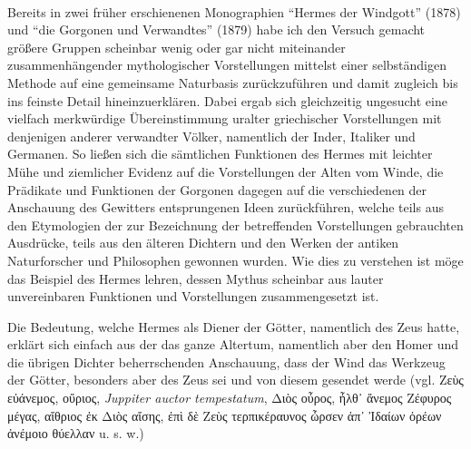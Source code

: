 \documentclass[a4paper, 11pt, oneside]{article}
\begin{document}
\paragraph{}
Bereits in zwei früher erschienenen Monographien "`Hermes der Windgott"' (1878) und "`die Gorgonen und Verwandtes"' (1879) habe ich den Versuch gemacht größere Gruppen scheinbar wenig oder gar nicht miteinander zusammenhängender mythologischer Vorstellungen mittelst einer selbständigen Methode auf eine gemeinsame Naturbasis zurückzuführen und damit zugleich bis ins feinste Detail hineinzuerklären. Dabei ergab sich gleichzeitig ungesucht eine vielfach merkwürdige Übereinstimmung uralter griechischer Vorstellungen mit denjenigen anderer verwandter Völker, namentlich der Inder, Italiker und Germanen. So ließen sich die sämtlichen Funktionen des Hermes mit leichter Mühe und ziemlicher Evidenz auf die Vorstellungen der Alten vom Winde, die Prädikate und Funktionen der Gorgonen dagegen auf die verschiedenen der Anschauung des Gewitters entsprungenen Ideen zurückführen, welche teils aus den Etymologien der zur Bezeichnung der betreffenden Vorstellungen gebrauchten Ausdrücke, teils aus den älteren Dichtern und den Werken der antiken Naturforscher und Philosophen gewonnen wurden. Wie dies zu verstehen ist möge das Beispiel des Hermes lehren, dessen Mythus scheinbar aus lauter unvereinbaren Funktionen und Vorstellungen zusammengesetzt ist.

Die Bedeutung, welche Hermes als Diener der Götter, namentlich des Zeus hatte, erklärt sich einfach aus der das ganze Altertum, namentlich aber den Homer und die übrigen Dichter beherrschenden Anschauung, dass der Wind das Werkzeug der Götter, besonders aber des Zeus sei und von diesem gesendet werde (vgl. Ζεὺς εὐάνεμος, οὔριος, \emph{Juppiter auctor tempestatum}, Διὸς οὖρος, ἦλθ᾽ ἄνεμος Ζέφυρος μέγας, αἴθριος ἐκ Διὸς αἴσης, ἐπὶ δὲ Ζεὺς τερπικέραυνος ὦρσεν ἀπ᾽ Ἰδαίων ὀρέων ἀνέμοιο θύελλαν u. s. w.)
\end{document}
